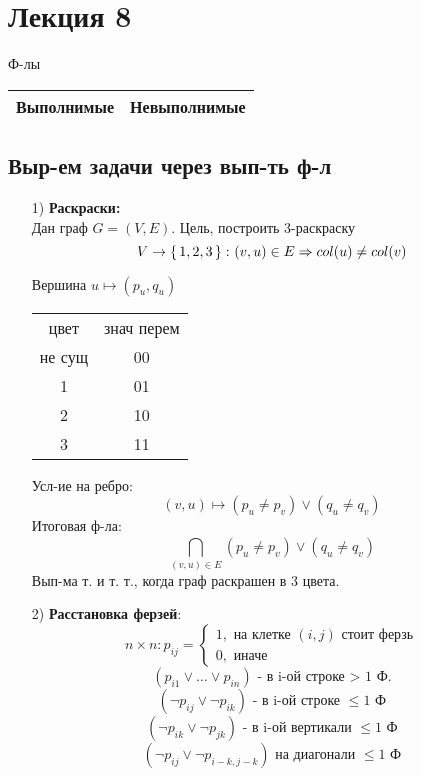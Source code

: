 \section{Лекция 8}
\begin{center}
  Ф-лы \\
\begin{tabular}{ |c|c| } 
 \hline
  Выполнимые & Невыполнимые \\ 
 \hline
\end{tabular}
\end{center}
\subsection{Выр-ем задачи через вып-ть ф-л}
\begin{itemize}
  \item [1) ] \textbf{Раскраски:} \\
    Дан граф $G = (V, E)$. Цель, построить 3-раскраску
    \[
      V \rightarrow \set{1, 2, 3} \colon (v, u) \in E \Rightarrow col(u) \neq col(v)
    \]
    \begin{center}
    Вершина $u \mapsto (p_u, q_u)$ \\
    \begin{tabular}{ c c } 
      цвет & знач перем \\
      не сущ & 00 \\
      1 & 01 \\
      2 & 10 \\
      3 & 11
    \end{tabular}
    \end{center}
    Усл-ие на ребро: \\
    \[
      (v, u) \mapsto (p_u \neq p_v) \lor (q_u \neq q_v)
    \]
    Итоговая ф-ла:
    \[
    \bigcap_{(v, u) \in E}^{} (p_u \neq p_v) \lor (q_u \neq q_v)
    \]
    Вып-ма т. и т. т., когда граф раскрашен в 3 цвета.
  \item [2) ] \textbf{Расстановка ферзей}:
    \[
    n \times n \colon p_{ij} = \begin{cases}
    1, \text{ на клетке $(i, j)$ стоит ферзь} \\
    0, \text{ иначе}
    \end{cases}
    \]
    \[
      (p_{i 1} \lor \ldots \lor p_{i n}) \text{ - в i-ой строке > 1 Ф.}
    \]
    \[
      (\neg p_{ij} \lor \neg p_{ik}) \text{ - в i-ой строке $\leq 1$ Ф}
    \]
    \[
      (\neg p_{i k} \lor \neg p_{j k}) \text{ - в i-ой вертикали $\leq 1$ Ф}
    \]
    \[
      (\neg p_{i j} \lor \neg p_{i - k, j - k}) \text{ на диагонали $\leq 1$ Ф}
\]
\end{itemize}
